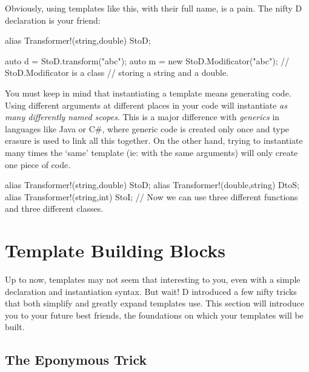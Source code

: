 Obviously, using templates like this, with their full name, is a pain. The nifty D  declaration is your friend:

\begin{dcode}
alias Transformer!(string,double) StoD;

auto d = StoD.transform("abc");
auto m = new StoD.Modificator("abc"); // StoD.Modificator is a class
                                      // storing a string and a double.
\end{dcode}

You must keep in mind that instantiating a template means generating code. Using different arguments at different places in your code will instantiate \emph{as many differently named scopes}. This is a major difference with \emph{generics} in languages like Java or C\#, where generic code is created only once and type erasure is used to link all this together. On the other hand, trying to instantiate many times the `same' template (ie: with the same arguments) will only create one piece of code.

\begin{dcode}
alias Transformer!(string,double) StoD;
alias Transformer!(double,string) DtoS;
alias Transformer!(string,int)    StoI;
// Now we can use three different functions and three different classes.
\end{dcode}


\section{Template Building Blocks}\label{buildingblocks}

Up to now, templates may not seem that interesting to you, even with a simple declaration and instantiation syntax. But wait! D introduced a few nifty tricks that both simplify and greatly expand templates use. This section will introduce you to your future best friends, the foundations on which your templates will be built.

\subsection{The Eponymous Trick}\label{eponymous}


